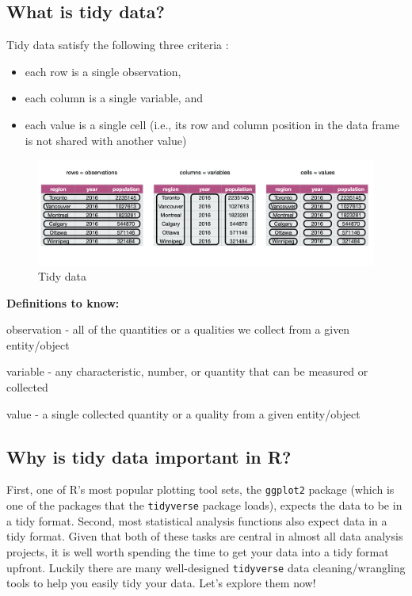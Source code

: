 \documentclass[
]{krantz}
\providecommand{\tightlist}{%
  \setlength{\itemsep}{0pt}\setlength{\parskip}{0pt}}
\renewenvironment{quote}{\begin{VF}}{\end{VF}}
\begin{document}
\hypertarget{what-is-tidy-data}{%
\subsection{What is tidy data?}\label{what-is-tidy-data}}

Tidy data satisfy the following three criteria \citep{wickham2014tidy}:

\begin{itemize}
\tightlist
\item
  each row is a single observation,
\item
  each column is a single variable, and
\item
  each value is a single cell (i.e., its row and column position in the data frame is not shared with another value)
\end{itemize}

\begin{figure}
\includegraphics[width=1\linewidth]{img/tidy_data} \caption{Tidy data}\label{fig:02-tidy-image}
\end{figure}

\begin{quote}
\textbf{Definitions to know:}

observation - all of the quantities or a qualities we collect from a given entity/object

variable - any characteristic, number, or quantity that can be measured or collected

value - a single collected quantity or a quality from a given entity/object
\end{quote}

\hypertarget{why-is-tidy-data-important-in-r}{%
\subsection{Why is tidy data important in R?}\label{why-is-tidy-data-important-in-r}}

First, one of R's most popular plotting tool sets, the \texttt{ggplot2} package (which is one of the packages that the \texttt{tidyverse} package loads), expects the data to be in a tidy format. Second, most statistical analysis functions also expect data in a tidy format. Given that both of these tasks are central in almost all data analysis projects, it is well worth spending the time to get your data into a tidy format upfront. Luckily there are many well-designed \texttt{tidyverse} data cleaning/wrangling tools to help you easily tidy your data. Let's explore them now!
\end{document}
